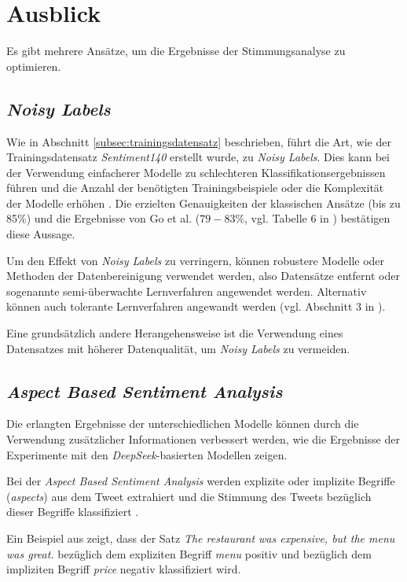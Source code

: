 \section{Ausblick}\label{sec:ausblick}

Es gibt mehrere Ansätze, um die Ergebnisse der Stimmungsanalyse zu optimieren.

\subsection{\textit{Noisy Labels}}
Wie in Abschnitt \ref{subsec:trainingsdatensatz} beschrieben, führt die Art, wie der Trainingsdatensatz \textit{Sentiment140} erstellt wurde, zu \textit{Noisy Labels}.
Dies kann bei der Verwendung einfacherer Modelle zu schlechteren Klassifikationsergebnissen führen und die Anzahl der benötigten Trainingsbeispiele oder die Komplexität der Modelle erhöhen \cite{NoisyLabel2014}.
Die erzielten Genauigkeiten der klassischen Ansätze (bis zu 85\%) und die Ergebnisse von  Go et al. ($79-83\%$, vgl. Tabelle 6 in \cite{go2009twitter}) bestätigen diese Aussage.

Um den Effekt von \textit{Noisy Labels} zu verringern, können robustere Modelle oder Methoden der Datenbereinigung verwendet werden, also Datensätze entfernt oder sogenannte semi-überwachte Lernverfahren angewendet werden. Alternativ können auch tolerante Lernverfahren angewandt werden (vgl. Abschnitt 3 in \cite{NoisyLabel2014}).

Eine grundsätzlich andere Herangehensweise ist die Verwendung eines Datensatzes mit höherer Datenqualität, um \textit{Noisy Labels} zu vermeiden.

\subsection{\textit{Aspect Based Sentiment Analysis}}

Die erlangten Ergebnisse der unterschiedlichen Modelle können durch die Verwendung zusätzlicher Informationen verbessert werden, wie die Ergebnisse der Experimente mit den \textit{DeepSeek}-basierten Modellen zeigen.

Bei der \textit{Aspect Based Sentiment Analysis} werden explizite oder implizite Begriffe (\textit{aspects}) aus dem Tweet extrahiert und die Stimmung des Tweets bezüglich dieser Begriffe klassifiziert \cite{Hua_2024}.

Ein Beispiel aus \cite{Hua_2024} zeigt, dass der Satz \glqq \textit{The restaurant was expensive, but the menu was great.}\grqq{} bezüglich dem expliziten Begriff \textit{menu} positiv und bezüglich dem impliziten Begriff \textit{price} negativ klassifiziert wird.

